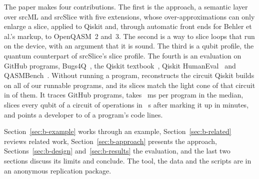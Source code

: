 The paper makes four contributions.
The first is the approach, a semantic layer over srcML and srcSlice with five extensions, whose over-approximations can
only enlarge a slice, applied to Qiskit and, through automatic front ends for Behler et al.'s markup, to OpenQASM~2 and~3. The second is a way to slice loops that run on the device, with an argument that it is sound. The
third is a qubit profile, the quantum counterpart of srcSlice's slice profile. The fourth is an evaluation on
\numScaleSOneFiles{} GitHub programs, Bugs4Q~\cite{zhao2023bugs4q}, the Qiskit textbook~\cite{qiskittextbook}, Qiskit
HumanEval~\cite{vishwakarma2024qhe} and QASMBench~\cite{li2023qasmbench}. Without running a
program, \tool{} reconstructs the circuit Qiskit builds on all \numToolDevPrograms{} of our runnable programs, and its
slices match the light cone of that circuit in \numToolDevSliceEqual{} of them. It traces \numScaleSOneSliced{} GitHub
programs, takes \numScaleSOneMedianMs{}~ms per program in the median, slices every qubit of a circuit of
\numScaleQbMaxOps{} operations in \numScaleQbAllS{}~s after marking it up in \numScaleQbReadMin{} minutes, and points a developer to \numScaleReadMedianPct{} of a program's
code lines.

Section~\ref{sec:b-example} works through an example, Section~\ref{sec:b-related} reviews related work,
Section~\ref{sec:b-approach} presents the approach, Sections~\ref{sec:b-design} and~\ref{sec:b-results} the evaluation,
and the last two sections discuss its limits and conclude. The tool, the data and the scripts are in an anonymous
replication package.
